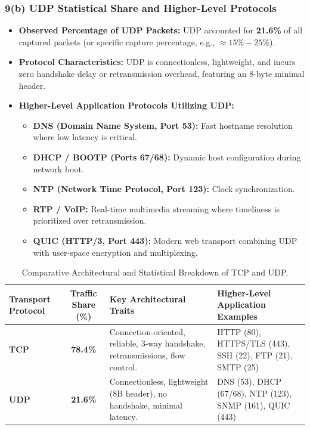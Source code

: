 \documentclass[12pt, a4paper]{article}
\begin{document}
\subsubsection{9(b) UDP Statistical Share and Higher-Level Protocols}
\begin{itemize}
    \item \textbf{Observed Percentage of UDP Packets:} UDP accounted for \textbf{21.6\%} of all captured packets (or specific capture percentage, e.g., $\approx 15\%-25\%$).
    \item \textbf{Protocol Characteristics:} UDP is connectionless, lightweight, and incurs zero handshake delay or retransmission overhead, featuring an 8-byte minimal header.
    \item \textbf{Higher-Level Application Protocols Utilizing UDP:}
    \begin{itemize}
        \item \textbf{DNS (Domain Name System, Port 53):} Fast hostname resolution where low latency is critical.
        \item \textbf{DHCP / BOOTP (Ports 67/68):} Dynamic host configuration during network boot.
        \item \textbf{NTP (Network Time Protocol, Port 123):} Clock synchronization.
        \item \textbf{RTP / VoIP:} Real-time multimedia streaming where timeliness is prioritized over retransmission.
        \item \textbf{QUIC (HTTP/3, Port 443):} Modern web transport combining UDP with user-space encryption and multiplexing.
    \end{itemize}
\end{itemize}

\begin{table}[H]
\centering
\begin{tabularx}{0.95\textwidth}{|l|c|X|X|}
\hline
\textbf{Transport Protocol} & \textbf{Traffic Share (\%)} & \textbf{Key Architectural Traits} & \textbf{Higher-Level Application Examples} \\ \hline
\textbf{TCP} & \textbf{78.4\%} & Connection-oriented, reliable, 3-way handshake, retransmissions, flow control. & HTTP (80), HTTPS/TLS (443), SSH (22), FTP (21), SMTP (25) \\ \hline
\textbf{UDP} & \textbf{21.6\%} & Connectionless, lightweight (8B header), no handshake, minimal latency. & DNS (53), DHCP (67/68), NTP (123), SNMP (161), QUIC (443) \\ \hline
\end{tabularx}
\caption{Comparative Architectural and Statistical Breakdown of TCP and UDP.}
\label{tab:tcp_vs_udp}
\end{table}
\end{document}
